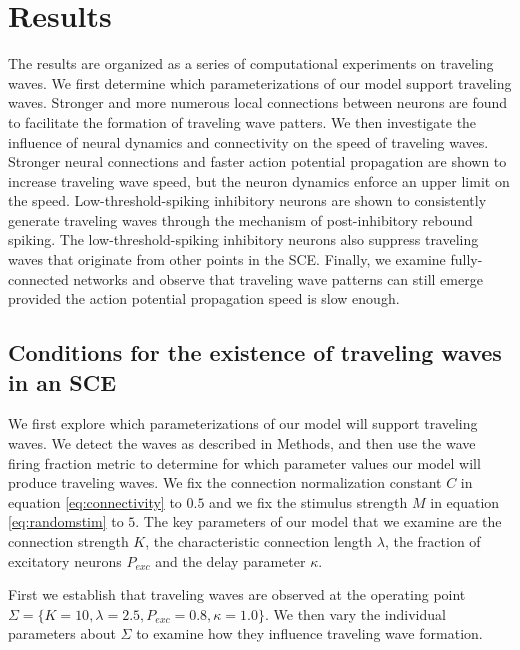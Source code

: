 \documentclass[12pt]{article}
\begin{document}
\section{Results}
The results are organized as a series of computational experiments on traveling waves.
We first determine which parameterizations of our model support traveling waves.
Stronger and more numerous local connections between neurons are found to facilitate the formation of traveling wave patters.
We then investigate the influence of neural dynamics and connectivity on the speed of traveling waves.
Stronger neural connections and faster action potential propagation are shown to increase traveling wave speed, but the neuron dynamics enforce an upper limit on the speed. 
Low-threshold-spiking inhibitory neurons are shown to consistently generate traveling waves through the mechanism of post-inhibitory rebound spiking.
The low-threshold-spiking inhibitory neurons also suppress traveling waves that originate from other points in the SCE.
Finally, we examine fully-connected networks and observe that traveling wave patterns can still emerge provided the action potential propagation speed is slow enough.

\subsection{Conditions for the existence of traveling waves in an SCE} \label{sub:waves}
We first explore which parameterizations of our model will support traveling waves.
We detect the waves as described in Methods, and then use the wave firing fraction metric to determine for which parameter values our model will produce traveling waves.
We fix the connection normalization constant $C$ in equation \ref{eq:connectivity} to $0.5$ and we fix the stimulus strength $M$ in equation \ref{eq:randomstim} to $5$.
The key parameters of our model that we examine are the connection strength $K$, the characteristic connection length $\lambda$, the fraction of excitatory neurons $P_{exc}$ and the delay parameter $\kappa$.

First we establish that traveling waves are observed at the \color{red}operating \color{black} point $\Sigma = \{K=10,\lambda=2.5,P_{exc}=0.8,\kappa=1.0 \}$.
We then vary the individual parameters about $\Sigma$ to examine how they influence traveling wave formation.
\end{document}
